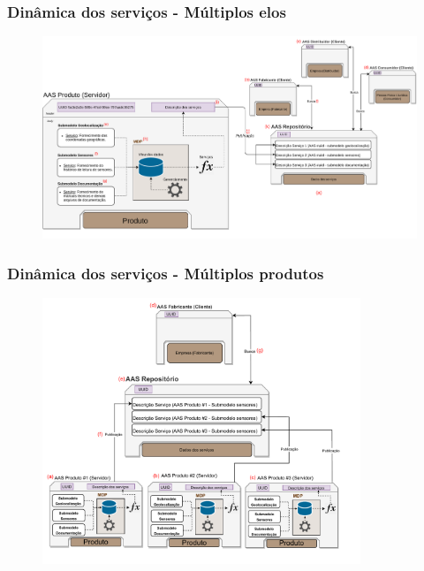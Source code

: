 \documentclass[10pt]{beamer}
\begin{document}
\begin{frame}
	\frametitle{Dinâmica dos serviços - Múltiplos elos}
	
	\begin{figure}[htb]
		\centering
		\label{fig:ppt-webservice-multielo}
		\includegraphics[width=1\textwidth]{ppt-webservice-multielo}
	\end{figure}
	
\end{frame}
\begin{frame}
	\frametitle{Dinâmica dos serviços - Múltiplos produtos}
	
	\begin{figure}[htb]
		\centering
		\label{fig:webservice-multiproduto}
		\includegraphics[width=0.85\textwidth]{webservice-multiproduto}
	\end{figure}
	
\end{frame}
\end{document}
